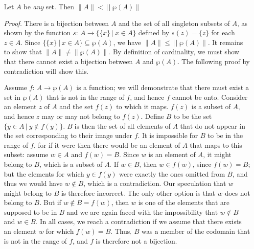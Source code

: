 \begin{thm}\label{thm-0.4}
Let $A$ be \emph{any} set. Then $\|A\| < \|\wp(A)\|$

\emph{Proof.} There is a bijection between $A$ and the set of all singleton
subsets of $A$, as shown by the function $s$: $A \rightarrow \{\{x\}\ |\ x \in A\}$
defined by $s(z) = \{z\}$ for each $z \in A$. Since
$\{\{x\}\ |\ x\in A\}\subseteq \wp(A)$, we have $\|A\| \leq \|\wp(A)\|$. It
remains to show that $\|A\| \not= \|\wp(A)\|$. By definition of cardinality, we
must show that there cannot exist a bijection between $A$ and $\wp(A)$. The
following proof by contradiction will show this.

Assume $f$: $A\rightarrow \wp(A)$ is a function; we will demonstrate that there
must exist a set in $\wp(A)$ that is not in the range of $f$, and hence $f$
cannot be onto. Consider an element $z$ of $A$ and the set $f(z)$ to which it
maps. $f(z)$ is a subset of $A$, and hence $z$ may or may not belong to $f(z)$.
Define $B$ to be the set $\{y \in A \ |\  y \not \in f(y)\}$. $B$ is then the set of
all elements of $A$ that do not appear in the set corresponding to their image
under $f$. It is impossible for $B$ to be in the range of $f$, for if it were
then there would be an element of $A$ that maps to this subset: assume $w \in A$
and $f(w) = B$. Since $w$ is an element of $A$, it might belong to $B$, which is
a subset of $A$. If $w \in B$, then $w \in f(w)$, since $f(w) = B$; but the
elements for which $y \in f(y)$ were exactly the ones omitted from $B$, and thus
we would have $w \not \in B$, which is a contradiction. Our speculation that $w$
might belong to $B$ is therefore incorrect. The only other option is that $w$
does not belong to $B$. But if $w \not \in B = f(w)$, then $w$ is one of the
elements that are supposed to be in $B$ and we are again faced with the
impossibility that $w \not \in B$ and $w \in B$. In all cases, we reach a
contradiction if we assume that there exists an element $w$ for which $f(w) = B$.
Thus, $B$ was a member of the codomain that is not in the range of $f$, and $f$ 
is therefore not a bijection.
\end{thm}

